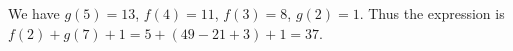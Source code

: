 We have $g(5)=13$, $f(4)=11$, $f(3)=8$, $g(2)=1$. Thus the expression is $f(2)+g(7)+1=5+(49-21+3)+1=\boxed{37}$.
